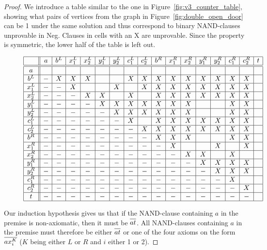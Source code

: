 \begin{proof}
We introduce a table similar to the one in Figure~\ref{fig:v3_counter_table}, showing what pairs of vertices from the graph in Figure~\ref{fig:double_open_door} can be 1 under the same solution and thus correspond to binary NAND-clauses unprovable in Neg.
Clauses in cells with an X are unprovable.
Since the property is symmetric, the lower half of the table is left out.\par
\begin{figure}[!h]
  \centering
  \[\begin{array}{|c||c|c|c|c|c|c|c|c|c|c|c|c|c|c|c|c|c|c|}
    \hline
          & a & b^L & x^L_1 & x^L_2 & y^L_1 & y^L_2 & c^L_1 & c^L_2 & b^R & x^R_1 & x^R_2 & y^R_1 & y^R_2 & c^R_1 & c^R_2 & t\\ \hline\hline
    a     & & & & & & & & & & & & & & & & \\ \hline
    b^L   &-& X & X & X & & & X & X & X & X & X & X & X & X & X & \\ \hline
    x^L_1 &-&-& X & & & X & & X & X & X & X & X & X & X & X & \\ \hline
    x^L_2 &-&-&-& X & X & & X & & X & X & X & X & X & X & X & \\ \hline
    y^L_1 &-&-&-&-& X & X & X & X & X & X & X & & & X & X & \\ \hline
    y^L_2 &-&-&-&-&-& X & X & X & X & X & X & & & X & X & \\ \hline
    c^L_1 &-&-&-&-&-&-& X & & X & X & X & X & X & X & X & \\ \hline
    c^L_2 &-&-&-&-&-&-&-& X & X & X & X & X & X & X & X & \\ \hline
    b^R   &-&-&-&-&-&-&-&-& X & X & X & & & X & X & \\ \hline
    x^R_1 &-&-&-&-&-&-&-&-&-& X & & & X & & X & \\ \hline
    x^R_2 &-&-&-&-&-&-&-&-&-&-& X & X & & X & & \\ \hline
    y^R_1 &-&-&-&-&-&-&-&-&-&-&-& X & X & X & X & \\ \hline
    y^R_2 &-&-&-&-&-&-&-&-&-&-&-&-& X & X & X & \\ \hline
    c^R_1 &-&-&-&-&-&-&-&-&-&-&-&-&-& X & & \\ \hline
    c^R_2 &-&-&-&-&-&-&-&-&-&-&-&-&-&-& X & \\ \hline
    t     &-&-&-&-&-&-&-&-&-&-&-&-&-&-&-& \\ \hline
  \end{array}\]
  \caption{}
  \label{fig:double_door_counter_table}
\end{figure}
\FloatBarrier
Our induction hypothesis gives us that if the NAND-clause containing $a$ in the premise is non-axiomatic, then it must be $\ol{at}$.
All NAND-clauses containing $a$ in the premise must therefore be either $\ol{at}$ or one of the four axioms on the form $\ol{ax^K_i}$ ($K$ being either $L$ or $R$ and $i$ either 1 or 2).


\end{proof}
